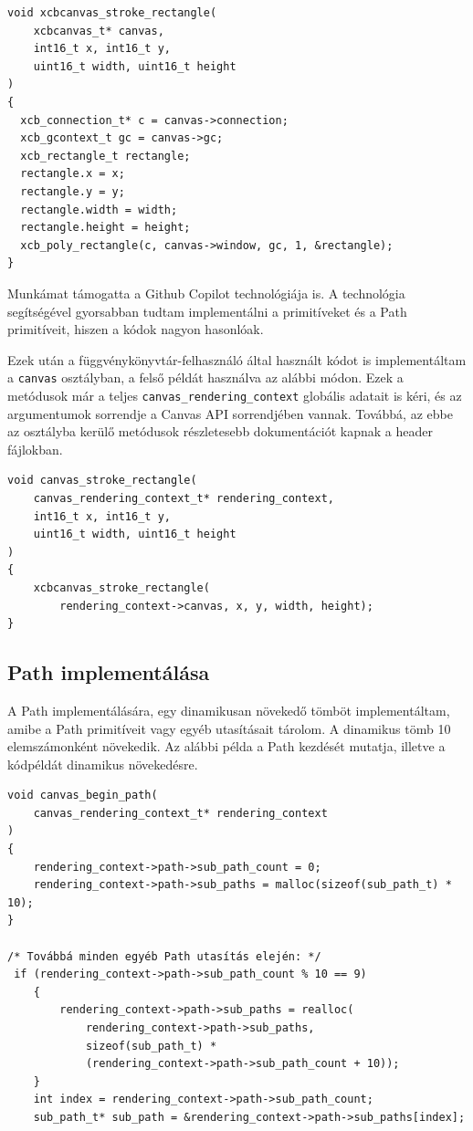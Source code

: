 \begin{verbatim}
void xcbcanvas_stroke_rectangle(
    xcbcanvas_t* canvas,
    int16_t x, int16_t y,
    uint16_t width, uint16_t height
)
{
  xcb_connection_t* c = canvas->connection;
  xcb_gcontext_t gc = canvas->gc;
  xcb_rectangle_t rectangle;
  rectangle.x = x;
  rectangle.y = y;
  rectangle.width = width;
  rectangle.height = height;
  xcb_poly_rectangle(c, canvas->window, gc, 1, &rectangle);
}
\end{verbatim}

Munkámat támogatta a Github Copilot technológiája is. A technológia segítségével gyorsabban tudtam implementálni a primitíveket és a Path primitíveit, hiszen a kódok nagyon hasonlóak.

Ezek után a függvénykönyvtár-felhasználó által használt kódot is implementáltam a \texttt{canvas} osztályban, a felső példát használva az alábbi módon. Ezek a metódusok már a teljes \texttt{canvas\_rendering\_context} globális adatait is kéri, és az argumentumok sorrendje a Canvas API sorrendjében vannak. Továbbá, az ebbe az osztályba kerülő metódusok részletesebb dokumentációt kapnak a header fájlokban.

\begin{verbatim}
void canvas_stroke_rectangle(
    canvas_rendering_context_t* rendering_context,
    int16_t x, int16_t y,
    uint16_t width, uint16_t height
)
{
    xcbcanvas_stroke_rectangle(
        rendering_context->canvas, x, y, width, height);
}
\end{verbatim}

\subsection{Path implementálása}

A Path implementálására, egy dinamikusan növekedő tömböt implementáltam, amibe a Path primitíveit vagy egyéb utasításait tárolom. A dinamikus tömb 10 elemszámonként növekedik. Az alábbi példa a Path kezdését mutatja, illetve a kódpéldát dinamikus növekedésre.

\begin{verbatim}
void canvas_begin_path(
    canvas_rendering_context_t* rendering_context
)
{
    rendering_context->path->sub_path_count = 0;
    rendering_context->path->sub_paths = malloc(sizeof(sub_path_t) * 10);
}

/* Továbbá minden egyéb Path utasítás elején: */
 if (rendering_context->path->sub_path_count % 10 == 9)
    {
        rendering_context->path->sub_paths = realloc(
            rendering_context->path->sub_paths,
            sizeof(sub_path_t) *
            (rendering_context->path->sub_path_count + 10));
    }
    int index = rendering_context->path->sub_path_count;
    sub_path_t* sub_path = &rendering_context->path->sub_paths[index];
\end{verbatim}

